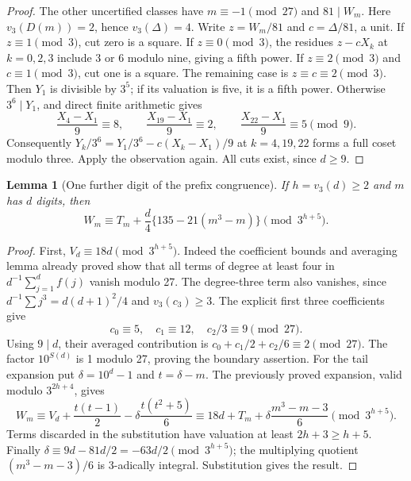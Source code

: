 \documentclass[10pt]{article}
\newtheorem{lemma}{Lemma}
\begin{document}
\begin{proof}
The other uncertified classes have $m\equiv-1\pmod{27}$ and
$81\mid W_m$. Here $v_3(D(m))=2$, hence $v_3(\Delta)=4$.
Write $z=W_m/81$ and $c=\Delta/81$, a unit.
If $z\equiv1\pmod3$, cut zero is a square.
If $z\equiv0\pmod3$, the residues $z-cX_k$ at $k=0,2,3$
include $3$ or $6$ modulo nine, giving a fifth power.
If $z\equiv2\pmod3$ and $c\equiv1\pmod3$, cut one is a square.
The remaining case is $z\equiv c\equiv2\pmod3$.
Then $Y_1$ is divisible by $3^5$; if its valuation is five, it is a
fifth power. Otherwise $3^6\mid Y_1$, and direct finite arithmetic gives
\[
 \frac{X_4-X_1}{9}\equiv8,\qquad
 \frac{X_{19}-X_1}{9}\equiv2,\qquad
 \frac{X_{22}-X_1}{9}\equiv5\pmod9.
\]
Consequently $Y_k/3^6=Y_1/3^6-c(X_k-X_1)/9$ at
$k=4,19,22$ forms a full coset modulo three. Apply the observation
again. All cuts exist, since $d\ge9$.
\end{proof}

\begin{lemma}[One further digit of the prefix congruence]\label{lem:strong-prefix}
If $h=v_3(d)\ge2$ and $m$ has $d$ digits, then
\[
 W_m\equiv T_m+\frac d4\{135-21(m^3-m)\}\pmod{3^{h+5}}.
\]
\end{lemma}
\begin{proof}
First, $V_d\equiv18d\pmod{3^{h+5}}$.
Indeed the coefficient bounds and averaging lemma already proved show
that all terms of degree at least four in $d^{-1}\sum_{j=1}^d f(j)$
vanish modulo 27. The degree-three term also vanishes, since
$d^{-1}\sum j^3=d(d+1)^2/4$ and $v_3(c_3)\ge3$.
The explicit first three coefficients give
\[
 c_0\equiv5,\quad c_1\equiv12,\quad c_2/3\equiv9\pmod{27}.
\]
Using $9\mid d$, their averaged contribution is
$c_0+c_1/2+c_2/6\equiv2\pmod{27}$.
The factor $10^{S(d)}$ is 1 modulo 27, proving the boundary assertion.
For the tail expansion put $\delta=10^d-1$ and $t=\delta-m$.
The previously proved expansion, valid modulo $3^{2h+4}$, gives
\[
 W_m\equiv V_d+\frac{t(t-1)}2-
 \delta\frac{t(t^2+5)}6
 \equiv18d+T_m+\delta\frac{m^3-m-3}{6}
 \pmod{3^{h+5}}.
\]
Terms discarded in the substitution have valuation at least
$2h+3\ge h+5$. Finally
$\delta\equiv9d-81d/2=-63d/2\pmod{3^{h+5}}$;
the multiplying quotient $(m^3-m-3)/6$ is 3-adically integral.
Substitution gives the result.
\end{proof}
\end{document}
